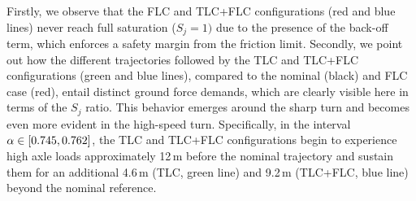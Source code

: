 Firstly, we observe that the FLC and TLC+FLC configurations (red and blue lines) never reach full saturation ($S_j=1)$ due to the presence of the back-off term, which enforces a safety margin from the friction limit.
Secondly, we point out how the different trajectories followed by the TLC and TLC+FLC configurations (green and blue lines), compared to the nominal (black) and FLC case (red), entail distinct ground force demands, which are clearly visible here in terms of the $S_j$ ratio.
This behavior emerges around the sharp turn and becomes even more evident in the high-speed turn.
Specifically, in the interval $\alpha \in [0.745, 0.762]$, the TLC and TLC+FLC configurations begin to experience high axle loads approximately 12\,m before the nominal trajectory and sustain them for an additional 4.6\,m (TLC, green line) and 9.2\,m (TLC+FLC, blue line) beyond the nominal reference.


